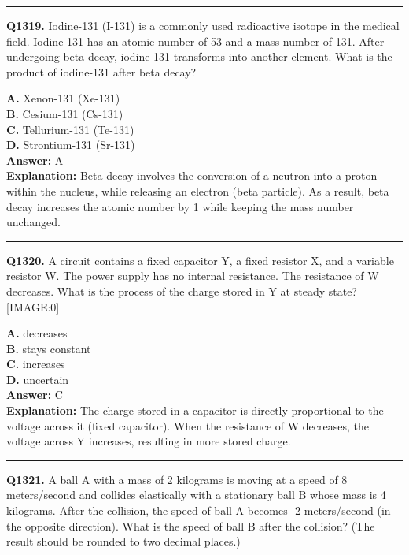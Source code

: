 \documentclass[12pt]{article}
\begin{document}
\hrule
\vspace{1em}


\noindent
\textbf{Q1319.} Iodine-131 (I-131) is a commonly used radioactive isotope in the medical field. Iodine-131 has an atomic number of 53 and a mass number of 131. After undergoing beta decay, iodine-131 transforms into another element. What is the product of iodine-131 after beta decay?



\textbf{A.} Xenon-131 (Xe-131) \\
\textbf{B.} Cesium-131 (Cs-131) \\
\textbf{C.} Tellurium-131 (Te-131) \\
\textbf{D.} Strontium-131 (Sr-131) \\

\textbf{Answer:} A \\
\textbf{Explanation:} Beta decay involves the conversion of a neutron into a proton within the nucleus, while releasing an electron (beta particle). As a result, beta decay increases the atomic number by 1 while keeping the mass number unchanged.

\hrule
\vspace{1em}


\noindent
\textbf{Q1320.} A circuit contains a fixed capacitor Y, a fixed resistor X, and a variable resistor W. The power supply has no internal resistance.
The resistance of W decreases. What is the process of the charge stored in Y at steady state?
[IMAGE:0]



\textbf{A.} decreases \\
\textbf{B.} stays constant \\
\textbf{C.} increases \\
\textbf{D.} uncertain \\

\textbf{Answer:} C \\
\textbf{Explanation:} The charge stored in a capacitor is directly proportional to the voltage across it (fixed capacitor). When the resistance of W decreases, the voltage across Y increases, resulting in more stored charge.

\hrule
\vspace{1em}


\noindent
\textbf{Q1321.} A ball A with a mass of 2 kilograms is moving at a speed of 8 meters/second and collides elastically with a stationary ball B whose mass is 4 kilograms. After the collision, the speed of ball A becomes -2 meters/second (in the opposite direction). What is the speed of ball B after the collision? (The result should be rounded to two decimal places.)
\end{document}
